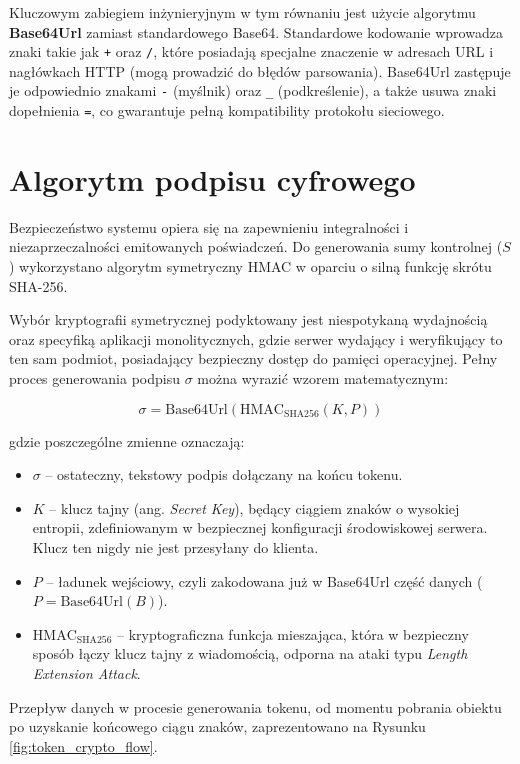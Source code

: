 \documentclass{SGGW-thesis}
\begin{document}
Kluczowym zabiegiem inżynieryjnym w tym równaniu jest użycie algorytmu \textbf{Base64Url} zamiast standardowego Base64. Standardowe kodowanie wprowadza znaki takie jak \texttt{+} oraz \texttt{/}, które posiadają specjalne znaczenie w adresach URL i nagłówkach HTTP (mogą prowadzić do błędów parsowania). Base64Url zastępuje je odpowiednio znakami \texttt{-} (myślnik) oraz \texttt{\_} (podkreślenie), a także usuwa znaki dopełnienia \texttt{=}, co gwarantuje pełną kompatibility protokołu sieciowego.

\clearpage

\section{Algorytm podpisu cyfrowego}

Bezpieczeństwo systemu opiera się na zapewnieniu integralności i niezaprzeczalności emitowanych poświadczeń. Do generowania sumy kontrolnej ($S$) wykorzystano algorytm symetryczny HMAC w oparciu o silną funkcję skrótu SHA-256. 

Wybór kryptografii symetrycznej podyktowany jest niespotykaną wydajnością oraz specyfiką aplikacji monolitycznych, gdzie serwer wydający i weryfikujący to ten sam podmiot, posiadający bezpieczny dostęp do pamięci operacyjnej. Pełny proces generowania podpisu $\sigma$ można wyrazić wzorem matematycznym:

$$ \sigma = \text{Base64Url}(\text{HMAC}_{\text{SHA256}}(K, P)) $$

gdzie poszczególne zmienne oznaczają:
\begin{itemize}
    \item $\sigma$ – ostateczny, tekstowy podpis dołączany na końcu tokenu.
    \item $K$ – klucz tajny (ang. \textit{Secret Key}), będący ciągiem znaków o wysokiej entropii, zdefiniowanym w bezpiecznej konfiguracji środowiskowej serwera. Klucz ten nigdy nie jest przesyłany do klienta.
    \item $P$ – ładunek wejściowy, czyli zakodowana już w Base64Url część danych ($P = \text{Base64Url}(B)$).
    \item $\text{HMAC}_{\text{SHA256}}$ – kryptograficzna funkcja mieszająca, która w bezpieczny sposób łączy klucz tajny z wiadomością, odporna na ataki typu \textit{Length Extension Attack}.
\end{itemize}

Przepływ danych w procesie generowania tokenu, od momentu pobrania obiektu po uzyskanie końcowego ciągu znaków, zaprezentowano na Rysunku \ref{fig:token_crypto_flow}.
\end{document}
